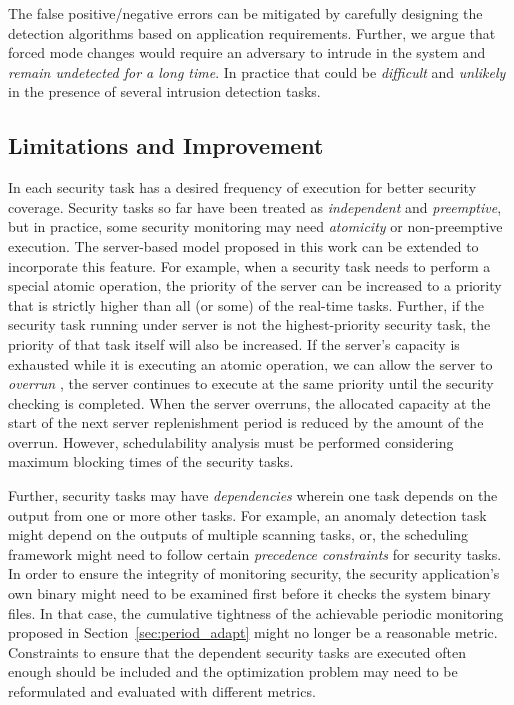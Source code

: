 \documentclass[../rt_server_main.tex]{subfiles}
\begin{document}
The false positive/negative errors can be mitigated by carefully designing the detection algorithms based on application requirements. Further, we argue that forced mode changes would require an adversary to intrude in the system and \textit{remain undetected for a long time}. In practice that could be \textit{difficult} and \textit{unlikely} in the  presence of several intrusion detection tasks. 


\subsection{Limitations and Improvement}



In \coolname each
security task has a desired frequency of execution for better security
coverage. Security tasks so far have been treated as \textit{independent} and
\textit{preemptive}, but in practice, some security monitoring
may need \textit{atomicity} or non-preemptive execution. The server-based model proposed in this work can be extended to incorporate this feature. For example, when a security task needs to perform a special atomic operation, the priority of the server can be increased to a priority that is strictly higher than all (or some) of the real-time tasks. Further, if the security task running under server is not the highest-priority security task, the priority of that task itself will also be increased. If the server's capacity is exhausted while it is executing an atomic operation, we can allow the server to \textit{overrun} \cite{server_overrun}, \ie the server continues to execute at the same priority until the security checking is completed. When the server overruns, the allocated capacity at the start of the next server replenishment period is reduced by the amount of the overrun. However, schedulability analysis must be performed considering maximum blocking times of the security tasks.

Further, security tasks may
have \textit{dependencies} wherein one task depends on the output from one or more other
tasks. For example, an anomaly detection task might depend on the outputs of
multiple scanning tasks, or, the scheduling framework might need to follow
certain \textit{precedence constraints} for security tasks. In
order to ensure the integrity of monitoring security, the security application's
own binary might need to be examined first before it checks the system binary
files. %
In that case, the {\emph cumulative tightness} of the achievable
periodic monitoring proposed in Section~\ref{sec:period_adapt} might no
longer be a reasonable metric. Constraints to ensure that the dependent security tasks are
executed often enough should be included and the optimization problem may need to be
reformulated and evaluated with different metrics.
\end{document}
